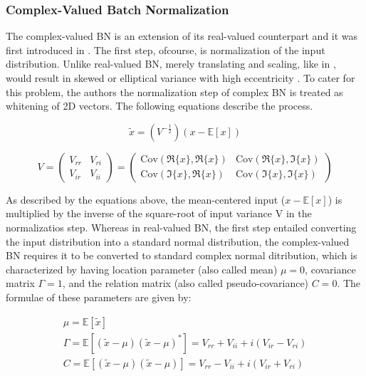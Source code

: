  \subsubsection{Complex-Valued Batch Normalization}
The complex-valued BN is an extension of its real-valued counterpart and it was first introduced in \cite{trabelsi2018deep}. The first step, ofcourse, is normalization of the input distribution. Unlike real-valued BN, merely translating and scaling, like in \cite{bnIoffeS15}, would result in skewed or elliptical variance with high eccentricity \cite{trabelsi2018deep}. To cater for this problem, the authors the normalization step of complex BN is treated  as whitening of 2D vectors. The following equations describe the process.

 \begin{equation}
\tilde{x} = (V^{-\frac{1}{2}})(x - \mathbb{E}[x])
\label{eqcbn1}
\end{equation}

 \begin{equation}
V = \begin{pmatrix} V_{rr} & V_{ri}\\ V_{ir} & V_{ii} \end{pmatrix} = 
\begin{pmatrix} \mathrm{Cov}(\Re{\{x\}},\Re{\{x\}}) & \mathrm{Cov}(\Re{\{x\}},\Im{\{x\}})\\  \mathrm{Cov}(\Im{\{x\}},\Re{\{x\}}) & \mathrm{Cov}(\Im{\{x\}},\Im{\{x\}}) \end{pmatrix}
\label{eqcbn2}
\end{equation}

As described by the equations above, the mean-centered input ($x - \mathbb{E}[x]$) is multiplied by the inverse of the square-root of input variance $\mathrm{V}$ in the normalizatios step.%
Whereas in real-valued BN, the first step entailed converting the input distribution into a standard normal distribution, the complex-valued BN requires it to be converted to standard complex normal ditribution, which is characterized by having location parameter (also called mean) $\mu = 0$, covariance matrix $\Gamma = 1$, and the relation matrix (also called pseudo-covariance) $C = 0$. The formulae of these parameters are given by:

\begin{equation}
\label{eqcbn3}
\begin{aligned}
&\mu = \mathbb{E}[\tilde{x}]&\\
&\Gamma = \mathbb{E}[(\tilde{x}-\mu)(\tilde{x}-\mu)^{*}] = V_{rr} + V_{ii} + i (V_{ir} - V_{ri} )&\\
&C = \mathbb{E}[(\tilde{x}-\mu)(\tilde{x}-\mu)] = V_{rr} - V_{ii} + i (V_{ir} + V_{ri} )&
\end{aligned}
\end{equation}

